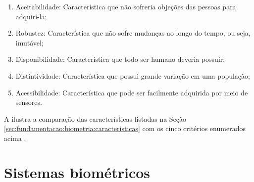 \begin{enumerate}
    \item Aceitabilidade: Característica que não sofreria objeções das pessoas para adquirí-la;
    \item Robustez: Característica que não sofre mudanças ao longo do tempo, ou seja, imutável;
    \item Disponibilidade: Característica que todo ser humano deveria possuir;
    \item Distintividade: Característica que possui grande variação em uma população;
    \item Acessibilidade: Característica que pode ser facilmente adquirida por meio de sensores.
\end{enumerate}

\par A  ilustra a comparação das características listadas na Seção \ref{sec:fundamentacao:biometria:caracteristicas} com os cinco critérios enumerados acima \cite{mali2013}.


\section{Sistemas biométricos}\label{sec:fundamentacao:sis_bio}

